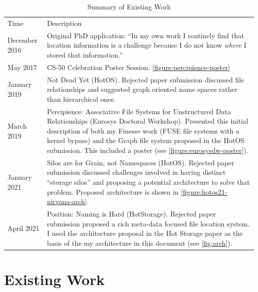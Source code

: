 \begin{table}[!htb]
    \caption{Summary of Existing Work}
    \label{table:existing-work}
    {\renewcommand{\arraystretch}{1.3} %
        \begin{tabular}{p{2cm}p{9cm}}
            Time          & Description                                                        \\
            December 2016 & Original PhD application: ``In my own work I routinely
            find that location information is a challenge because I do not know
            \emph{where} I stored that information.''                                          \\
            May 2017      & CS-50 Celebration Poster Session.
            \autoref{figure:percipience-poster}                                                \\
            January 2019  & Not Dead Yet (HotOS).  Rejected paper submission
            discussed file relationships and suggested graph oriented name spaces
            rather than hierarchical ones.
            \\
            March 2019    & Percipience: Associative File Systems for Unstructured Data
            Relationships (Eurosys Doctoral Workshop). Presented this initial
            description of both my Finesse work (FUSE file systems with a kernel
            bypass) and the Graph file system proposed in the HotOS submission. This
            included a poster (see \autoref{figure:eurosysdw-poster}).
            \\
            January 2021  & Silos are for Grain, not Namespaces (HotOS).  Rejected
            paper submission discussed challenges involved in having distinct
            ``storage silos'' and proposing a potential architecture to solve that
            problem.  Proposed architecture is shown in \autoref{figure:hotos21-nirvana-arch}. \\

            April 2021    & Position: Naming is Hard (HotStorage).  Rejected paper
            submission proposed a rich meta-data focused file location system.
            I used the architecture proposal in the Hot Storage paper as the basis of the
            my architecture in this document (see \autoref{fig:arch}).
        \end{tabular}
    }%
\end{table}

\section{Existing Work}
\label{ch:plan:sec:existing-work}

